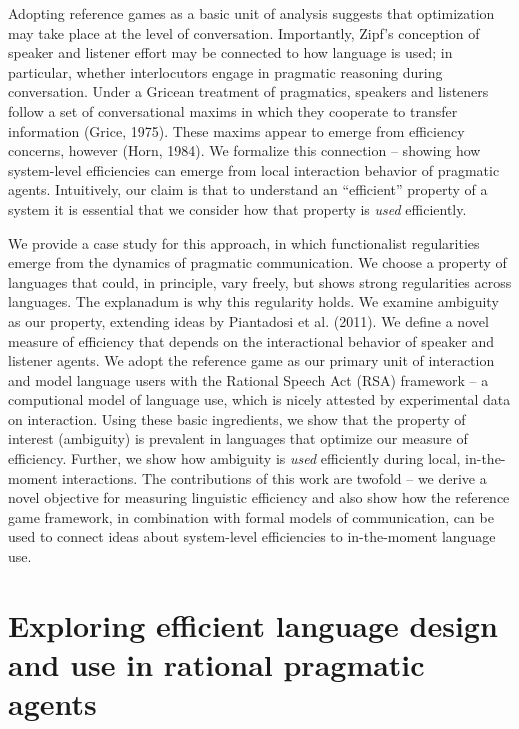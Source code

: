 \documentclass[10pt, letterpaper]{article}
\begin{document}
Adopting reference games as a basic unit of analysis suggests that
optimization may take place at the level of conversation. Importantly,
Zipf's conception of speaker and listener effort may be connected to how
language is used; in particular, whether interlocutors engage in
pragmatic reasoning during conversation. Under a Gricean treatment of
pragmatics, speakers and listeners follow a set of conversational maxims
in which they cooperate to transfer information (Grice, 1975). These
maxims appear to emerge from efficiency concerns, however (Horn, 1984).
We formalize this connection -- showing how system-level efficiencies
can emerge from local interaction behavior of pragmatic agents.
Intuitively, our claim is that to understand an ``efficient'' property
of a system it is essential that we consider how that property is
\emph{used} efficiently.\par

We provide a case study for this approach, in which functionalist
regularities emerge from the dynamics of pragmatic communication. We
choose a property of languages that could, in principle, vary freely,
but shows strong regularities across languages. The explanadum is why
this regularity holds. We examine ambiguity as our property, extending
ideas by Piantadosi et al. (2011). We define a novel measure of
efficiency that depends on the interactional behavior of speaker and
listener agents. We adopt the reference game as our primary unit of
interaction and model language users with the Rational Speech Act (RSA)
framework -- a computional model of language use, which is nicely
attested by experimental data on interaction. Using these basic
ingredients, we show that the property of interest (ambiguity) is
prevalent in languages that optimize our measure of efficiency. Further,
we show how ambiguity is \textit{used} efficiently during local,
in-the-moment interactions. The contributions of this work are twofold
-- we derive a novel objective for measuring linguistic efficiency and
also show how the reference game framework, in combination with formal
models of communication, can be used to connect ideas about system-level
efficiencies to in-the-moment language use.\par

\section{Exploring efficient language design and use in rational
pragmatic
agents}\label{exploring-efficient-language-design-and-use-in-rational-pragmatic-agents}
\end{document}
